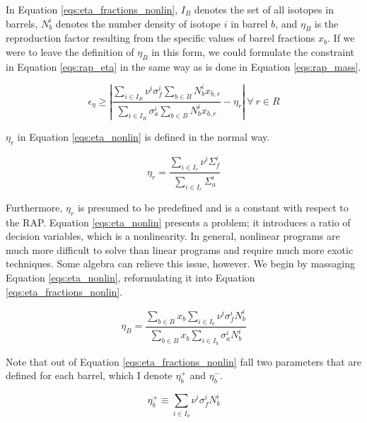 In Equation \ref{eqs:eta_fractions_nonlin}, $I_{B}$ denotes the set of all
isotopes in barrels, $N_{b}^{i}$ denotes the number density of isotope $i$ in
barrel $b$, and $\eta_{B}$ is the reproduction factor resulting from the
specific values of barrel fractions $x_{b}$. If we were to leave the definition
of $\eta_{B}$ in this form, we could formulate the constraint in
Equation \ref{eqs:rap_eta} in the same way as is done in
Equation \ref{eqs:rap_mass}.

\begin{equation}
\label{eqs:eta_nonlin}
\epsilon_{\eta} \geq \left| 
\frac{\sum_{i \in I_{B}} \nu^{i} \sigma_{f}^{i} \sum_{b \in B} N_{b}^{i} x_{b,r}}
     {\sum_{i \in I_{B}} \sigma_{a}^{i} \sum_{b \in B} N_{b}^{i} x_{b,r}} 
- \eta_{r} \right|
\: \forall \: r \in R
\end{equation}

$\eta_{r}$ in Equation \ref{eqs:eta_nonlin} is defined in the normal way.

\begin{equation}
\label{eqs:eta_r}
\eta_{r} = \frac{\sum_{i \in I_{r}} \nu^{i} \Sigma_{f}^{i}}
                {\sum_{i \in I_{r}} \Sigma_{a}^{i}}
\end{equation}

Furthermore, $\eta_{r}$ is presumed to be predefined and is a constant with
respect to the RAP. Equation \ref{eqs:eta_nonlin} presents a problem; it
introduces a ratio of decision variables, which is a nonlinearity. In general,
nonlinear programs are much more difficult to solve than linear programs and
require much more exotic techniques. Some algebra can relieve this issue,
however. We begin by massaging Equation \ref{eqs:eta_nonlin}, reformulating it
into Equation \ref{eqs:eta_fractions_nonlin}.

\begin{equation}
\label{eqs:eta_fractions_lin}
\eta_{B} = \frac{\sum_{b \in B} x_{b} \sum_{i \in I_{b}} \nu^{i} \sigma_{f}^{i} N_{b}^{i}}
                {\sum_{b \in B} x_{b} \sum_{i \in I_{b}} \sigma_{a}^{i} N_{b}^{i}}
\end{equation}

Note that out of Equation \ref{eqs:eta_fractions_nonlin} fall two parameters
that are defined for each barrel, which I denote $\eta_{b}^{+}$ and
$\eta_{b}^{-}$.

\begin{equation}
\label{eqs:eta_+}
\eta_{b}^{+} \equiv \sum_{i \in I_{b}} \nu^{i} \sigma_{f}^{i} N_{b}^{i}
\end{equation}

